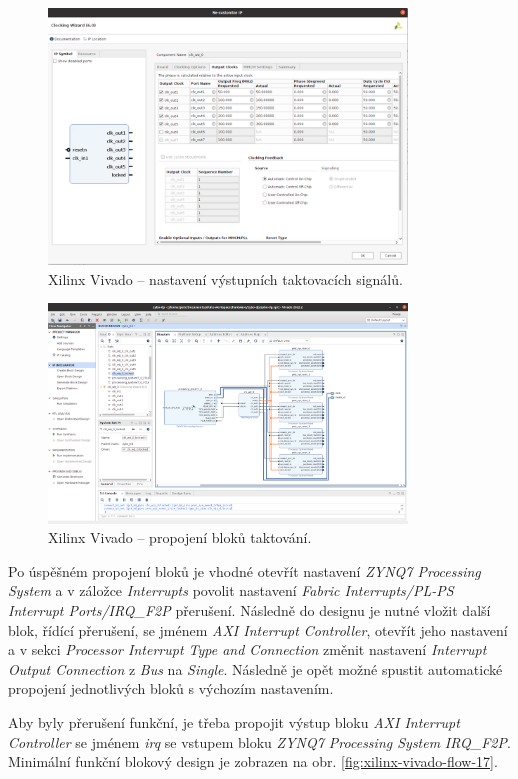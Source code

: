 \documentclass[a4paper, twoside, 11pt]{article}
\newcommand{\fbar}{\FloatBarrier}
\begin{document}
		\begin{figure}[htbp!]
			\centering
			\includegraphics[width=0.85\textwidth]{src/png/xilinx-vivado-flow/xilinx-vivado-flow-36.png}
			\caption{Xilinx Vivado – nastavení výstupních taktovacích signálů.}
			\label{fig:xilinx-vivado-flow-36}
		\end{figure}

		\begin{figure}[htbp!]
			\centering
			\includegraphics[width=0.85\textwidth]{src/png/xilinx-vivado-flow/xilinx-vivado-flow-12.png}
			\caption{Xilinx Vivado – propojení bloků taktování.}
			\label{fig:xilinx-vivado-flow-12}
		\end{figure}

		\fbar

		Po úspěšném propojení bloků je vhodné otevřít nastavení \textit{ZYNQ7 Processing System} a v záložce \textit{Interrupts} povolit nastavení \textit{Fabric Interrupts/PL-PS Interrupt Ports/IRQ\_F2P} přerušení. Následně do designu je nutné vložit další blok, řídící přerušení, se jménem \textit{AXI Interrupt Controller}, otevřít jeho nastavení a v sekci \textit{Processor Interrupt Type and Connection} změnit nastavení \textit{Interrupt Output Connection} z \textit{Bus} na \textit{Single}. Následně je opět možné spustit automatické propojení jednotlivých bloků s výchozím nastavením.\par
		Aby byly přerušení funkční, je třeba propojit výstup bloku \textit{AXI Interrupt Controller} se jménem \textit{irq} se vstupem bloku \textit{ZYNQ7 Processing System} \textit{IRQ\_F2P}. Minimální funkční blokový design je zobrazen na obr. \ref{fig:xilinx-vivado-flow-17}.
\end{document}

